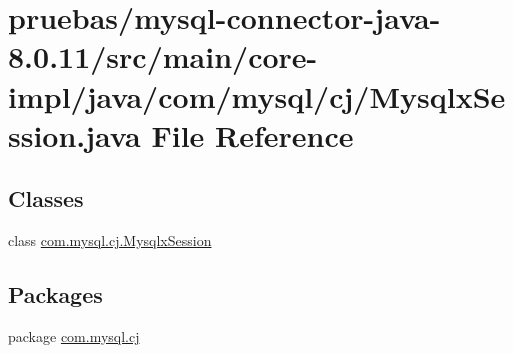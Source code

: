 \hypertarget{main_2core-impl_2java_2com_2mysql_2cj_2_mysqlx_session_8java}{}\section{pruebas/mysql-\/connector-\/java-\/8.0.11/src/main/core-\/impl/java/com/mysql/cj/\+Mysqlx\+Session.java File Reference}
\label{main_2core-impl_2java_2com_2mysql_2cj_2_mysqlx_session_8java}
\subsection*{Classes}
\begin{DoxyCompactItemize}
\item 
class \mbox{\hyperlink{classcom_1_1mysql_1_1cj_1_1_mysqlx_session}{com.\+mysql.\+cj.\+Mysqlx\+Session}}
\end{DoxyCompactItemize}
\subsection*{Packages}
\begin{DoxyCompactItemize}
\item 
package \mbox{\hyperlink{namespacecom_1_1mysql_1_1cj}{com.\+mysql.\+cj}}
\end{DoxyCompactItemize}
